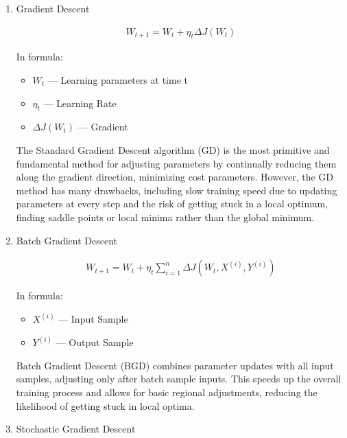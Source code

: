 \documentclass[10pt,journal,compsoc]{IEEEtran}
\begin{document}
\begin{enumerate}
    \item Gradient Descent

\begin{equation}
    \begin{aligned}
        W_{t + 1} = W_t + \eta_t \Delta J (W_t)
    \end{aligned}
\end{equation}

In formula:

\begin{itemize}[label={}]
    \item $W_t$ --- Learning parameters at time t
    \item $\eta_t$ --- Learning Rate
    \item $\Delta J (W_t)$ --- Gradient
\end{itemize}

The Standard Gradient Descent algorithm (GD) is the most primitive and fundamental method for adjusting parameters by continually reducing them along the gradient direction, minimizing cost parameters. However, the GD method has many drawbacks, including slow training speed due to updating parameters at every step and the risk of getting stuck in a local optimum, finding saddle points or local minima rather than the global minimum.

    \item Batch Gradient Descent

\begin{equation}
    \begin{aligned}
        W_{t + 1} = W_t + \eta_t \sum_{i=1}^{n} {\Delta J (W_t, X^{(i)}, Y^{(i)})}
    \end{aligned}
\end{equation}

In formula:

\begin{itemize}[label={}]
    \item $X^{(i)}$ --- Input Sample
    \item $Y^{(i)}$ --- Output Sample
\end{itemize}

Batch Gradient Descent (BGD) combines parameter updates with all input samples, adjusting only after batch sample inputs. This speeds up the overall training process and allows for basic regional adjustments, reducing the likelihood of getting stuck in local optima.

    \item Stochastic Gradient Descent


\end{enumerate}
\end{document}
